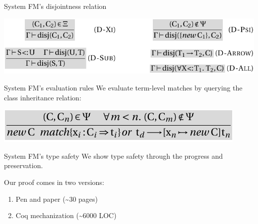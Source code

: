 \documentclass[10pt]{beamer}
\newenvironment{slide}[2][]
  {\begin{frame}[fragile,environment=slide,#1]{#2}}
  {\end{frame}}
\begin{document}
\begin{slide}{System FM's disjointness relation}
\begin{center}
\includegraphics[width=\textwidth]{figures/FMDisjointness.pdf}
\end{center}
\end{slide}

\begin{slide}{System FM's evaluation rules}
We evaluate term-level matches by querying the class inheritance relation:
\begin{center}
\includegraphics{figures/FMEMatch.pdf}
\end{center}


\begin{center}
\end{center}
\end{slide}

\begin{slide}{System FM's type safety}
We show type safety through the progress and preservation.

Our proof comes in two versions:
\begin{enumerate}
  \item Pen and paper (\textasciitilde30 pages)
  \item Coq mechanization (\textasciitilde6000 LOC)
\end{enumerate}
\end{slide}
\end{document}
